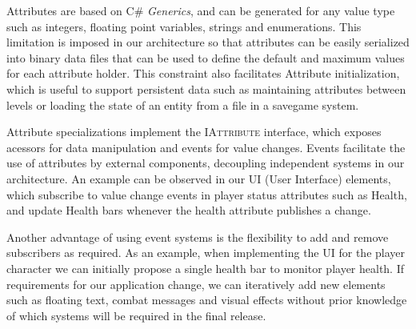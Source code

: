 Attributes are based on \textsc{C\#} \emph{Generics}, and can be generated for any value type such as integers, floating point variables, strings and enumerations. This limitation is imposed in our architecture so that attributes can be easily serialized into binary data files that can be used to define the default and maximum values for each attribute holder. This constraint also facilitates Attribute initialization, which is useful to support persistent data such as maintaining attributes between levels  or loading the state of an entity from a file in a savegame system.


Attribute specializations implement the \textsc{IAttribute} interface, which exposes acessors for data manipulation and events for value changes. Events facilitate the use of attributes by external components, decoupling independent systems in our architecture. An example can be observed in our UI (User Interface) elements, which subscribe to value change events in player status attributes such as Health, and update Health bars whenever the health attribute publishes a change.

Another advantage of using event systems is the flexibility to add and remove subscribers as required. As an example, when implementing the UI for the player character we can initially propose a single health bar to monitor player health. If requirements for our application change, we can iteratively add new elements such as floating text, combat messages and visual effects without prior knowledge of which systems will be required in the final release. 

